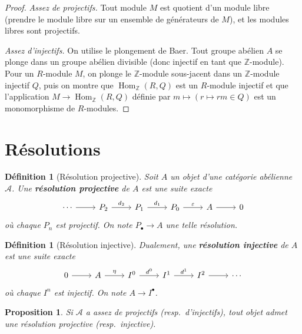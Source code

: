 \documentclass[a4paper,12pt]{book}
\DeclareMathOperator{\Hom}{Hom}
\newcommand{\Z}{\mathbb{Z}}
\newtheorem{proposition}[theoreme]{Proposition}
\newtheorem{definition}[theoreme]{Définition}
\begin{document}
\begin{proof}
\emph{Assez de projectifs.} Tout module $M$ est quotient d'un module
libre (prendre le module libre sur un ensemble de générateurs de $M$),
et les modules libres sont projectifs.

\emph{Assez d'injectifs.} On utilise le plongement de Baer. Tout
groupe abélien $A$ se plonge dans un groupe abélien divisible
(donc injectif en tant que $\Z$-module). Pour un $R$-module $M$,
on plonge le $\Z$-module sous-jacent dans un $\Z$-module injectif $Q$,
puis on montre que $\Hom_\Z(R, Q)$ est un $R$-module injectif
et que l'application $M \to \Hom_\Z(R, Q)$ définie par
$m \mapsto (r \mapsto rm \in Q)$ est un monomorphisme de $R$-modules.
\end{proof}


\section{Résolutions}\label{sec:resolutions}

\begin{definition}[Résolution projective]\label{def:projective-resolution}
Soit $A$ un objet d'une catégorie abélienne $\mathcal{A}$.
Une \textbf{résolution projective} de $A$ est une suite exacte
\[
\begin{tikzcd}
\cdots \arrow[r] & P_2 \arrow[r, "d_2"] & P_1 \arrow[r, "d_1"]
  & P_0 \arrow[r, "\varepsilon"] & A \arrow[r] & 0
\end{tikzcd}
\]
où chaque $P_n$ est projectif. On note $P_\bullet \to A$ une telle résolution.
\end{definition}

\begin{definition}[Résolution injective]\label{def:injective-resolution}
Dualement, une \textbf{résolution injective} de $A$ est une suite exacte
\[
\begin{tikzcd}
0 \arrow[r] & A \arrow[r, "\eta"] & I^0 \arrow[r, "d^0"]
  & I^1 \arrow[r, "d^1"] & I^2 \arrow[r] & \cdots
\end{tikzcd}
\]
où chaque $I^n$ est injectif. On note $A \to I^\bullet$.
\end{definition}

\begin{proposition}\label{prop:resolution-existence}
Si $\mathcal{A}$ a assez de projectifs (resp.\ d'injectifs), tout
objet admet une résolution projective (resp.\ injective).
\end{proposition}
\end{document}
